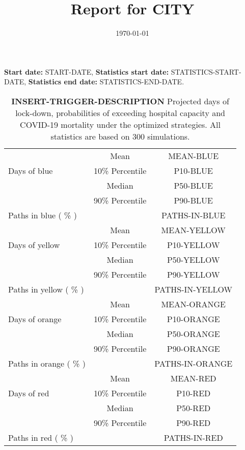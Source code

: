 \documentclass{article}
\title{Report for CITY}
\author{}
\date{\today}
\begin{document}
 \textbf{Start date:} START-DATE,	
\textbf{Statistics start date:} STATISTICS-START-DATE,
\textbf{Statistics end date:} STATISTICS-END-DATE.
\begin{table}[!htb]
	\centering
	\begin{tabular}{p{4cm}cc}
		\toprule
		\multirow{3}{*}{Days of blue} & Mean      & MEAN-BLUE                     \\ \cmidrule(l){2-3} 
		& 10\% Percentile    & P10-BLUE                      \\ \cmidrule(l){2-3} 
		& Median    & P50-BLUE                     \\ \cmidrule(l){2-3} 
		& 90\% Percentile    & P90-BLUE                          \\ \midrule 
		\multirow{1}{*}{Paths in blue ( \% )} &      &         PATHS-IN-BLUE                \\   \midrule
		\multirow{3}{*}{Days of yellow} & Mean      & MEAN-YELLOW                       \\ \cmidrule(l){2-3} 
		& 10\% Percentile    & P10-YELLOW                      \\ \cmidrule(l){2-3} 
		& Median    & P50-YELLOW                     \\ \cmidrule(l){2-3} 
		& 90\% Percentile    & P90-YELLOW                     \\ \midrule    
		\multirow{1}{*}{Paths in yellow ( \% )} &      &         PATHS-IN-YELLOW           \\   \midrule
		\multirow{3}{*}{Days of orange} & Mean      & MEAN-ORANGE                    \\ \cmidrule(l){2-3} 
		& 10\% Percentile    & P10-ORANGE                      \\ \cmidrule(l){2-3} 
		& Median    & P50-ORANGE                    \\ \cmidrule(l){2-3} 
		& 90\% Percentile    & P90-ORANGE                      \\ \midrule    
		\multirow{1}{*}{Paths in orange ( \% )} &      &         PATHS-IN-ORANGE              \\   \midrule
		\multirow{3}{*}{Days of red} & Mean      & MEAN-RED                        \\ \cmidrule(l){2-3} 
		& 10\% Percentile    & P10-RED                     \\ \cmidrule(l){2-3} 
		& Median    & P50-RED                      \\ \cmidrule(l){2-3} 
		& 90\% Percentile    & P90-RED                     \\   \midrule   
		\multirow{1}{*}{Paths in red ( \% )} &      &         PATHS-IN-RED            \\  \bottomrule
	\end{tabular}
	\caption{\textbf{INSERT-TRIGGER-DESCRIPTION} 
		 Projected days of lock-down, probabilities of exceeding hospital capacity and COVID-19 mortality under the optimized strategies. All statistics are based on 300 simulations.}
	\label{table:summary_table_tiers}
\end{table}   
\end{document}
